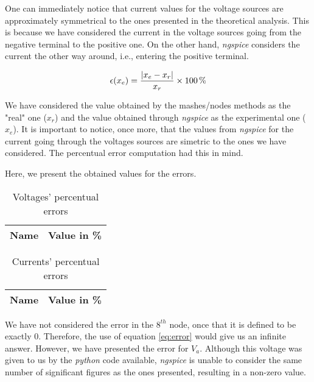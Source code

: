 One can immediately notice that current values for the voltage sources are approximately symmetrical to the ones presented in the theoretical analysis. This is because we have considered the current in the voltage sources going from the negative terminal to the positive one. On the other hand, \emph{ngspice} considers the current the other way around, i.e., entering the positive terminal.


\begin{equation}
  \centering
  \epsilon (x_e)=\frac{|x_e-x_r|}{x_r} \times 100\,\%
  \label{eq:error}
\end{equation}

We have considered the value obtained by the mashes/nodes methods as the "real" one ($x_r$) and the value obtained through \emph{ngspice} as the experimental one ($x_e$). It is important to notice, once more, that the values from \emph{ngspice} for the current going through the voltages sources are simetric to the ones we have considered. The percentual error computation had this in mind.

Here, we present the obtained values for the errors.

\begin{table}[H]
  \centering
  \begin{tabular}{|l|r|}
    \hline
    {\bf Name} & {\bf Value in \%} \\ \hline
    
  \end{tabular}
  \caption{Voltages' percentual errors}
  \label{tab:error_tensoes}
\end{table}



\begin{table}[H]
  \centering
  \begin{tabular}{|l|r|}
    \hline
    {\bf Name} & {\bf Value in \%} \\ \hline
    
  \end{tabular}
  \caption{Currents' percentual errors }
  \label{tab:error_current}
\end{table}

We have not considered the error in the $8^{th}$ node, once that it is defined to be exactly 0. Therefore, the use of equation \ref{eq:error} would give us an infinite answer. However, we have presented the error for $V_a$. Although this voltage was given to us by the \emph{python} code available, \emph{ngspice} is unable to consider the same number of significant figures as the ones presented, resulting in a non-zero value.



